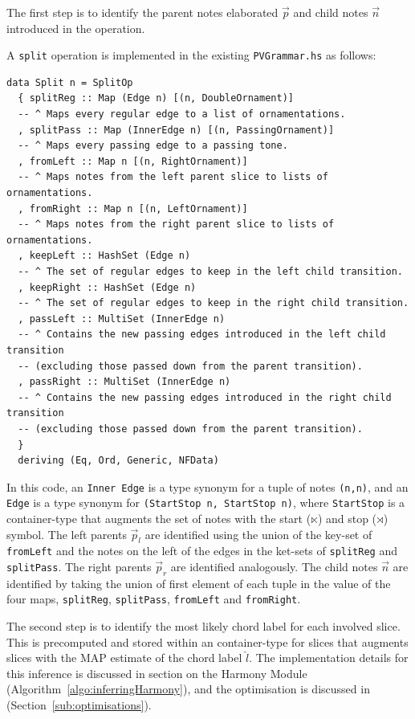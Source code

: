 \documentclass[12pt,a4paper,twoside,openany]{report} \usepackage[pdfborder={0 0 0}]{hyperref}    %
\theoremstyle{definition} \newtheorem{definition}{Definition}[section]
\begin{document}
    The first step is to identify the parent notes elaborated $\vec{p}$ and child notes $\vec{n}$ introduced in the
    operation.

    A \texttt{split} operation is implemented in the existing \texttt{PVGrammar.hs} as follows:

    \begin{lstlisting}[caption={Split Operation}, captionpos=b] 
data Split n = SplitOp
  { splitReg :: Map (Edge n) [(n, DoubleOrnament)]
  -- ^ Maps every regular edge to a list of ornamentations.
  , splitPass :: Map (InnerEdge n) [(n, PassingOrnament)]
  -- ^ Maps every passing edge to a passing tone.
  , fromLeft :: Map n [(n, RightOrnament)]
  -- ^ Maps notes from the left parent slice to lists of ornamentations.
  , fromRight :: Map n [(n, LeftOrnament)]
  -- ^ Maps notes from the right parent slice to lists of ornamentations.
  , keepLeft :: HashSet (Edge n)
  -- ^ The set of regular edges to keep in the left child transition.
  , keepRight :: HashSet (Edge n)
  -- ^ The set of regular edges to keep in the right child transition.
  , passLeft :: MultiSet (InnerEdge n)
  -- ^ Contains the new passing edges introduced in the left child transition
  -- (excluding those passed down from the parent transition).
  , passRight :: MultiSet (InnerEdge n)
  -- ^ Contains the new passing edges introduced in the right child transition
  -- (excluding those passed down from the parent transition).
  }
  deriving (Eq, Ord, Generic, NFData)
    \end{lstlisting}

    In this code, an \texttt{Inner Edge} is a type synonym for a tuple of notes \texttt{(n,n)}, and an \texttt{Edge} is
    a type synonym for \texttt{(StartStop n, StartStop n)}, where \texttt{StartStop} is a container-type that augments
    the set of notes with the start ($\ltimes$) and stop ($\rtimes$) symbol. 
    The left parents $\vec{p}_l$ are identified using the union of the key-set of \texttt{fromLeft} and the notes on the left of the edges
    in the ket-sets of \texttt{splitReg} and \texttt{splitPass}. The right parents $\vec{p}_r$ are identified
    analogously. The child notes $\vec{n}$ are identified by taking the union of first element of each tuple in the value of
    the four maps, \texttt{splitReg}, \texttt{splitPass}, \texttt{fromLeft} and \texttt{fromRight}.

    The second step is to identify the most likely chord label for each involved slice. This is precomputed and stored
    within an container-type for slices that augments slices with the MAP estimate of the chord label $\hat{l}$. The implementation details for
    this inference is discussed in section on the Harmony Module (Algorithm~\ref{algo:inferringHarmony}), and the optimisation
    is discussed in (Section~\ref{sub:optimisations}). 
\end{document}
